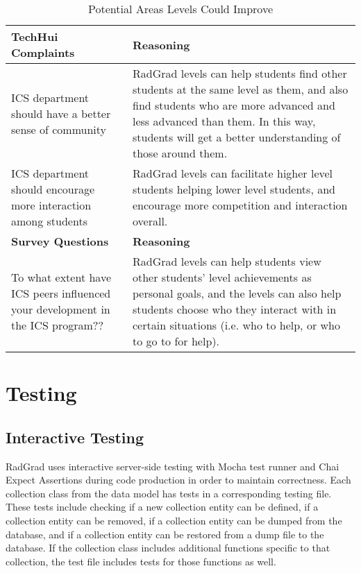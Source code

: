 \begin{table}[htbp!]
\centering
 \caption{Potential Areas Levels Could Improve}
\begin{tabular}{  |p{4cm}|p{12cm}| } 
\hline
 \textbf{TechHui Complaints} & \textbf{Reasoning} \\ 
  \hline
  ICS department should have a better sense of community & RadGrad levels can help students find other students at the same level as them, and also find students who are more advanced and less advanced than them. In this way, students will get a better understanding of those around them.\\
    \hline
  ICS department should encourage more interaction among students & RadGrad levels can facilitate higher level students helping lower level students, and encourage more competition and interaction overall. \\
  \hline
 \textbf{Survey Questions} & \textbf{Reasoning} \\ 
  \hline
   To what extent have ICS peers influenced your development in the ICS program?? & RadGrad levels can help students view other students' level achievements as personal goals, and the levels can also help students choose who they interact with in certain situations (i.e. who to help, or who to go to for help).\\
  \hline
\end{tabular}
\end{table}



\section{Testing}
\subsection{Interactive Testing}

RadGrad uses interactive server-side testing with Mocha test runner and Chai Expect Assertions during code production in order to maintain correctness. Each collection class from the data model has tests in a corresponding testing file. These tests include checking if a new collection entity can be defined, if a collection entity can be removed, if a collection entity can be dumped from the database, and if a collection entity can be restored from a dump file to the database. If the collection class includes additional functions specific to that collection, the test file includes tests for those functions as well.

